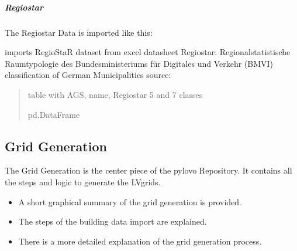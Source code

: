 \documentclass[letterpaper,10pt,english]{sphinxmanual}
\begin{document}
\subparagraph{Regiostar}
\label{\detokenize{docs_pylovo/municipal_register/municipal_register:regiostar}}
\sphinxAtStartPar
The Regiostar Data is imported like this:

\begin{fulllineitems}
\label{\detokenize{docs_pylovo/municipal_register/municipal_register:municipal_register.regiostar.import_regiostar.import_regiostar}}
\pysigstartsignatures
{}
\pysigstopsignatures
\sphinxAtStartPar
imports RegioStaR dataset from excel datasheet
Regiostar: Regionalstatistische Raumtypologie des Bundesministeriums für Digitales und Verkehr (BMVI)
classification of German Municipalities
source: 
\begin{quote}\begin{description}
\sphinxAtStartPar
table with AGS, name, Regiostar 5 and 7 classes

\sphinxAtStartPar
pd.DataFrame

\end{description}\end{quote}

\end{fulllineitems}


\sphinxstepscope


\subsection{Grid Generation}
\label{\detokenize{grid_generation/index:grid-generation}}\label{\detokenize{grid_generation/index::doc}}
\sphinxAtStartPar
The Grid Generation is the center piece of the pylovo Repository. It contains all the steps and logic to generate
the LV\sphinxhyphen{}grids.
\begin{itemize}
\item {} 
\sphinxAtStartPar
A short graphical summary of the grid generation is provided.

\item {} 
\sphinxAtStartPar
The steps of the building data import are explained.

\item {} 
\sphinxAtStartPar
There is a more detailed explanation of the grid generation process.

\end{itemize}
\end{document}
